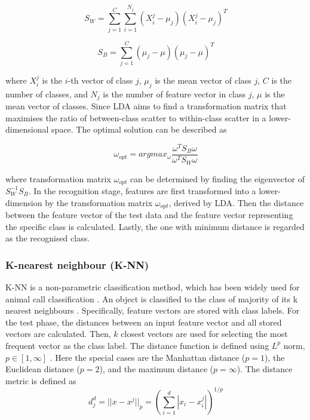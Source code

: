 \begin{equation}
S_{W}=\sum_{j=1}^{C}\sum_{i=1}^{N_{j}}(X_{i}^{j}-\mu_{j})(X_{i}^{j}-\mu_{j})^{T}
\end{equation}

\begin{equation}
S_{B}=\sum_{j=1}^{C}(\mu_{j}-\mu)(\mu_{j}-\mu)^{T}
\end{equation}

where $X_{i}^{j}$ is the $i$-th vector of class $j$, $\mu_{j}$ is the mean vector of class $j$, $C$ is the number of classes, and $N_{j}$ is the number of feature vector in class $j$, $\mu$ is the mean vector of classes. 
Since LDA aims to find a transformation matrix that maximises the ratio of between-class scatter to within-class scatter in a lower-dimensional space. The optimal solution can be described as 

\begin{equation}
\omega_{opt}=argmax_{\omega}\frac{\omega^{T}S_{B}\omega}{\omega^{T}S_{W}\omega} 
\end{equation}


where transformation matrix $\omega_{opt}$ can be determined by finding the eigenvector of $S_{W}^{-1}S_{B}$.
In the recognition stage, features are first transformed into a lower-dimension by the transformation matrix $\omega_{opt}$, derived by LDA. Then the distance between the feature vector of the test data and the feature vector representing the specific class is calculated. Lastly, the one with minimum distance is regarded as the recognised class.


\subsubsection{K-nearest neighbour (K-NN)}
K-NN is a non-parametric classification method, which has been widely used for animal call classification \citep{huang2009frog, han2011acoustic, Xie1504:Acoustic, Xie2016}. An object is classified to the class of majority of its k nearest neighbours \citep{huang2009frog}.  Specifically, feature vectors are stored with class labels. For the test phase, the distances between an input feature vector and all stored vectors are calculated. Then, $k$ closest vectors are used for selecting the most frequent vector as the class label. The distance function is defined using $L^{p}$ norm, $p \in [1,\infty]$ . Here the special cases are the Manhattan distance ($p=1$), the Euclidean distance ($p=2$), and the maximum distance ($p= \infty$). The distance metric is defined as 
\begin{equation}
d_{j}^{d}=||x-x^{j}||_{p} = (\sum_{i=1}^{d}|x_{i}-x_{i}^{j}|)^{1/p}
\end{equation}

